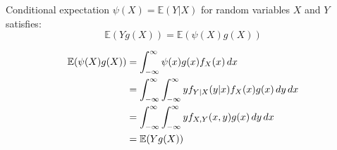 \documentclass{huhtakm-template-book}
\newcommand{\expect}{\mathbb{E}}
\begin{document}
    \begin{lem}
        Conditional expectation $\psi(X)=\expect(Y|X)$ for random variables $X$ and $Y$ satisfies:
        \begin{equation*}
            \expect(Yg(X))=\expect(\psi(X)g(X))
        \end{equation*}
    \end{lem}
    \begin{proofing}
        \begin{align*}
            \expect(\psi(X)g(X))&=\intinfty\psi(x)g(x)f_{X}(x)\,dx\\
            &=\intinfty\intinfty yf_{Y|X}(y|x)f_{X}(x)g(x)\,dy\,dx\\
            &=\intinfty\intinfty yf_{X,Y}(x,y)g(x)\,dy\,dx\\
            &=\expect(Yg(X))
        \end{align*}
    \end{proofing}
    
\end{document}
